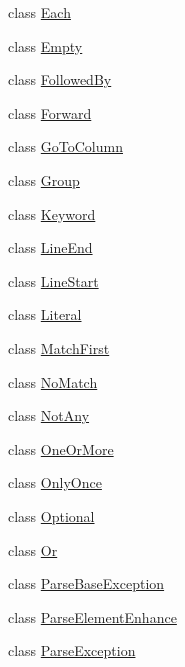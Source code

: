 \begin{DoxyCompactItemize}
class \hyperlink{classpkg__resources_1_1__vendor_1_1pyparsing_1_1Each}{Each}
\item 
class \hyperlink{classpkg__resources_1_1__vendor_1_1pyparsing_1_1Empty}{Empty}
\item 
class \hyperlink{classpkg__resources_1_1__vendor_1_1pyparsing_1_1FollowedBy}{Followed\+By}
\item 
class \hyperlink{classpkg__resources_1_1__vendor_1_1pyparsing_1_1Forward}{Forward}
\item 
class \hyperlink{classpkg__resources_1_1__vendor_1_1pyparsing_1_1GoToColumn}{Go\+To\+Column}
\item 
class \hyperlink{classpkg__resources_1_1__vendor_1_1pyparsing_1_1Group}{Group}
\item 
class \hyperlink{classpkg__resources_1_1__vendor_1_1pyparsing_1_1Keyword}{Keyword}
\item 
class \hyperlink{classpkg__resources_1_1__vendor_1_1pyparsing_1_1LineEnd}{Line\+End}
\item 
class \hyperlink{classpkg__resources_1_1__vendor_1_1pyparsing_1_1LineStart}{Line\+Start}
\item 
class \hyperlink{classpkg__resources_1_1__vendor_1_1pyparsing_1_1Literal}{Literal}
\item 
class \hyperlink{classpkg__resources_1_1__vendor_1_1pyparsing_1_1MatchFirst}{Match\+First}
\item 
class \hyperlink{classpkg__resources_1_1__vendor_1_1pyparsing_1_1NoMatch}{No\+Match}
\item 
class \hyperlink{classpkg__resources_1_1__vendor_1_1pyparsing_1_1NotAny}{Not\+Any}
\item 
class \hyperlink{classpkg__resources_1_1__vendor_1_1pyparsing_1_1OneOrMore}{One\+Or\+More}
\item 
class \hyperlink{classpkg__resources_1_1__vendor_1_1pyparsing_1_1OnlyOnce}{Only\+Once}
\item 
class \hyperlink{classpkg__resources_1_1__vendor_1_1pyparsing_1_1Optional}{Optional}
\item 
class \hyperlink{classpkg__resources_1_1__vendor_1_1pyparsing_1_1Or}{Or}
\item 
class \hyperlink{classpkg__resources_1_1__vendor_1_1pyparsing_1_1ParseBaseException}{Parse\+Base\+Exception}
\item 
class \hyperlink{classpkg__resources_1_1__vendor_1_1pyparsing_1_1ParseElementEnhance}{Parse\+Element\+Enhance}
\item 
class \hyperlink{classpkg__resources_1_1__vendor_1_1pyparsing_1_1ParseException}{Parse\+Exception}

\end{DoxyCompactItemize}

